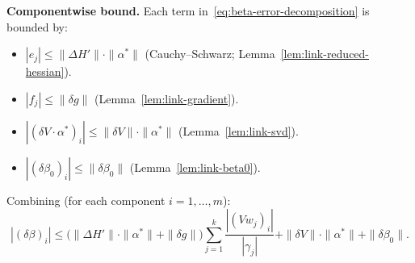 \begin{remark}
\textbf{Componentwise bound.}
Each term in~\eqref{eq:beta-error-decomposition} is bounded by:
\begin{itemize}
  \item $|e_j| \leq \|\Delta H'\| \cdot \|\alpha^*\|$
    (Cauchy--Schwarz; Lemma~\ref{lem:link-reduced-hessian}).
  \item $|f_j| \leq \|\delta g\|$
    (Lemma~\ref{lem:link-gradient}).
  \item $|(\delta V \cdot \alpha^*)_i|
    \leq \|\delta V\| \cdot \|\alpha^*\|$
    (Lemma~\ref{lem:link-svd}).
  \item $|(\delta\beta_0)_i| \leq \|\delta\beta_0\|$
    (Lemma~\ref{lem:link-beta0}).
\end{itemize}
Combining (for each component $i = 1, \ldots, m$):
\begin{equation}\label{eq:beta-certification-bound}
  |(\delta\beta)_i|
  \leq \bigl(\|\Delta H'\| \cdot \|\alpha^*\| + \|\delta g\|\bigr)
       \sum_{j=1}^{k} \frac{|(Vw_j)_i|}{|\gamma_j|}
  + \|\delta V\| \cdot \|\alpha^*\|
  + \|\delta\beta_0\|.
\end{equation}


\end{remark}
